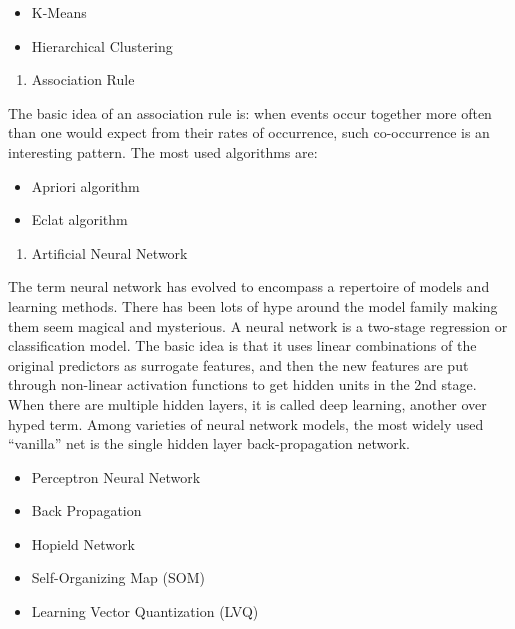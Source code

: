\documentclass[12pt,]{krantz}
\providecommand{\tightlist}{%
  \setlength{\itemsep}{0pt}\setlength{\parskip}{0pt}}
\theoremstyle{definition}
\theoremstyle{definition}
\theoremstyle{remark}
\begin{document}
\begin{itemize}
\tightlist
\item
  K-Means
\item
  Hierarchical Clustering
\end{itemize}

\begin{enumerate}
\def\labelenumi{\arabic{enumi}.}
\setcounter{enumi}{8}
\tightlist
\item
  Association Rule
\end{enumerate}

The basic idea of an association rule is: when events occur together
more often than one would expect from their rates of occurrence, such
co-occurrence is an interesting pattern. The most used algorithms are:

\begin{itemize}
\tightlist
\item
  Apriori algorithm
\item
  Eclat algorithm
\end{itemize}

\begin{enumerate}
\def\labelenumi{\arabic{enumi}.}
\setcounter{enumi}{9}
\tightlist
\item
  Artificial Neural Network
\end{enumerate}

The term neural network has evolved to encompass a repertoire of models
and learning methods. There has been lots of hype around the model
family making them seem magical and mysterious. A neural network is a
two-stage regression or classification model. The basic idea is that it
uses linear combinations of the original predictors as surrogate
features, and then the new features are put through non-linear
activation functions to get hidden units in the 2nd stage. When there
are multiple hidden layers, it is called deep learning, another over
hyped term. Among varieties of neural network models, the most widely
used ``vanilla'' net is the single hidden layer back-propagation
network.

\begin{itemize}
\tightlist
\item
  Perceptron Neural Network
\item
  Back Propagation
\item
  Hopield Network
\item
  Self-Organizing Map (SOM)
\item
  Learning Vector Quantization (LVQ)
\end{itemize}
\end{document}
